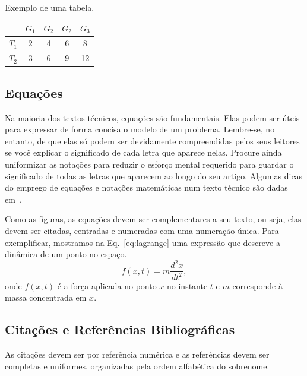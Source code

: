 \documentclass[11pt]{article}
\begin{document}
\begin{table}[H]
  {\centering
  \begin{tabular}{|c|c|c|c|c|}
  \hline
   & $G_1$ & $G_2$ & $G_2$ & $G_3$ \\
  \hline
  $T_1$ & 2 & 4 & 6 & 8 \\
  \hline
  $T_2$ & 3 & 6 & 9 & 12 \\
  \hline
  \end{tabular}
\caption{Exemplo de uma tabela.}
\label{tab:ex}
\par}
\end{table}

\subsection{Equa\c{c}\~{o}es}
\label{ssec:equacoes}

Na maioria dos textos t\'{e}cnicos, equa\c{c}\~{o}es s\~{a}o fundamentais. Elas podem ser \'{u}teis para expressar de forma
concisa o modelo de um problema. Lembre-se, no entanto, de que elas s\'{o} podem ser devidamente compreendidas
pelos seus leitores se voc\^{e} explicar o significado de cada letra que aparece nelas. Procure ainda uniformizar
as nota\c{c}\~{o}es para reduzir o esfor\c{c}o mental requerido para guardar o significado de todas as letras que
aparecem ao longo do seu artigo. Algumas dicas do emprego de equa\c{c}\~{o}es e nota\c{c}\~{o}es matem\'{a}ticas num texto
t\'{e}cnico s\~{a}o dadas em~\cite{K99}.

Como as figuras, as equa\c{c}\~{o}es devem ser complementares a seu texto, ou
seja, elas devem ser citadas, centradas e numeradas com uma numera\c{c}\~{a}o
\'{u}nica. Para exemplificar, mostramos na Eq.~\ref{eq:lagrange} uma
express\~{a}o que descreve a din\^{a}mica de um ponto no espa\c{c}o.
  \begin{equation}
  \label{eq:lagrange}
  f(x,t) = m \frac{d^2x}{dt^2},
  \end{equation}
onde $f(x,t)$ \'{e} a for\c{c}a aplicada no ponto $x$ no instante $t$ e $m$
corresponde \`{a} massa concentrada em $x$.

\subsection{Cita\c{c}\~{o}es e Refer\^{e}ncias Bibliogr\'{a}ficas}

As cita\c{c}\~{o}es devem ser por refer\^{e}ncia num\'{e}rica e as refer\^{e}ncias devem
ser completas e uniformes, organizadas pela ordem alfab\'{e}tica do
sobrenome.
\end{document}
